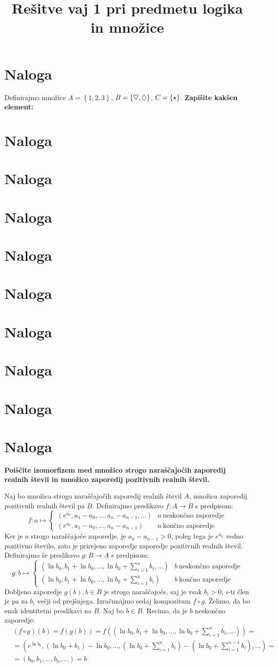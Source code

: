 \documentclass[12pt]{article}
\title{Rešitve vaj 1 pri predmetu logika in množice}
\newcommand{\naloga}{\section{Naloga}}
\begin{document}
\maketitle

\naloga
    Definirajmo množice \(A = \left\{1, 2, 3\right\}\), \(B = \left\{\ensuremath\heartsuit, \ensuremath\diamondsuit\right\}\), \(C = \left\{\ensuremath\star\right\}\).
    \textbf{Zapišite kakšen element:}
\naloga
\naloga
\naloga
\naloga
\naloga
\naloga
\naloga
\naloga
\naloga
    \textbf{Poiščite izomorfizem med množico strogo naraščajočih zaporedij realnih števil in množico zaporedij pozitivnih realnih števil.}

    Naj bo množica strogo naraščajočih zaporedij realnih števil \(A\), množica zaporedij pozitivnih realnih števil pa \(B\).
    Definirajmo preslikavo \(f: A \rightarrow B\) s predpisom:
    \begin{equation*}
        f: a \mapsto \begin{cases}
            \left(e^{a_0}, a_1 - a_0, \dots, a_n  - a_{n - 1}, \dots\right) & a\ \text{neskončno zaporedje}\\
            \left(e^{a_0}, a_1 - a_0, \dots, a_n  - a_{n - 1}\right) & a\ \text{končno zaporedje}
        \end{cases}
    \end{equation*}
    Ker je \(a\) strogo naraščajoče zaporedje, je \(a_{n} - a_{n - 1} > 0\), poleg tega je \(e^{a_0}\) vedno pozitivno število, zato je 
    prirejeno zaporedje zaporedje pozitivnih realnih števil.
    Definirajmo še preslikavo \(g: B \rightarrow A\) s predpisom: 
    \begin{equation*}
        g: b \mapsto \begin{cases}
            \left(\ln b_0, b_1 + \ln b_0, \dots, \ln b_0 + \sum_{i=1}^{n}b_i, \dots\right) & b\ \text{neskončno zaporedje}\\
            \left(\ln b_0, b_1 + \ln b_0, \dots, \ln b_0 + \sum_{i=1}^{n}b_i\right) & b\ \text{končno zaporedje}
        \end{cases}
    \end{equation*}
    Dobljeno zaporedje \(g(b), b \in B\) je strogo naraščajoče, saj je vsak \(b_i > 0\), \(i\)-ti člen je pa za \(b_i\) večji od prejšnjega.
    Izračunajmo sedaj kompozitum \(f \circ g\). Želimo, da bo enak identitetni preslikavi na \(B\). Naj bo \(b \in B\). Recimo, da je \(b\) neskončno zaporedje:
    \begin{align*}
        & (f \circ g)(b) = f(g(b)) = f\left(\left(\ln b_0, b_1 + \ln b_0, \dots, \ln b_0 + \sum_{i=1}^{n}b_i, \dots\right)\right) = \\
        &= \left(e^{\ln b_0}, \left(\ln b_0 + b_1\right) - \ln b_0, \dots, \left(\ln b_0 + \sum_{i=1}^{n}b_i\right) - \left(\ln b_0 + \sum_{i=1}^{n-1}b_i\right), \dots\right) = \\
        &= \left(b_0, b_1, \dots, b_n, \dots\right) = b
    \end{align*}
\end{document}
